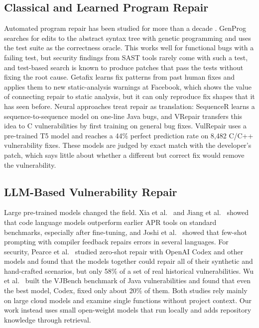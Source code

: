 \documentclass[12pt,onecolumn,draftclsnofoot]{IEEEtran}
\begin{document}
\subsection{Classical and Learned Program Repair}
Automated program repair has been studied for more than a decade \cite{monperrus2018bibliography, legoues2019apr}. GenProg \cite{legoues2012genprog} searches for edits to the abstract syntax tree with genetic programming and uses the test suite as the correctness oracle. This works well for functional bugs with a failing test, but security findings from SAST tools rarely come with such a test, and test-based search is known to produce patches that pass the tests without fixing the root cause. Getafix \cite{bader2019getafix} learns fix patterns from past human fixes and applies them to new static-analysis warnings at Facebook, which shows the value of connecting repair to static analysis, but it can only reproduce fix shapes that it has seen before. Neural approaches treat repair as translation: SequenceR \cite{chen2021sequencer} learns a sequence-to-sequence model on one-line Java bugs, and VRepair \cite{chen2023vrepair} transfers this idea to C vulnerabilities by first training on general bug fixes. VulRepair \cite{fu2022vulrepair} uses a pre-trained T5 model and reaches a 44\% perfect prediction rate on 8,482 C/C++ vulnerability fixes. These models are judged by exact match with the developer's patch, which says little about whether a different but correct fix would remove the vulnerability.

\subsection{LLM-Based Vulnerability Repair}
Large pre-trained models changed the field. Xia et al.\ \cite{xia2023apr} and Jiang et al.\ \cite{jiang2023impact} showed that code language models outperform earlier APR tools on standard benchmarks, especially after fine-tuning, and Joshi et al.\ \cite{joshi2023ring} showed that few-shot prompting with compiler feedback repairs errors in several languages. For security, Pearce et al.\ \cite{pearce2023zeroshot} studied zero-shot repair with OpenAI Codex and other models and found that the models together could repair all of their synthetic and hand-crafted scenarios, but only 58\% of a set of real historical vulnerabilities. Wu et al.\ \cite{wu2023effective} built the VJBench benchmark of Java vulnerabilities and found that even the best model, Codex, fixed only about 20\% of them. Both studies rely mainly on large cloud models and examine single functions without project context. Our work instead uses small open-weight models that run locally \cite{hui2024qwen25coder, dubey2024llama3} and adds repository knowledge through retrieval.
\end{document}
